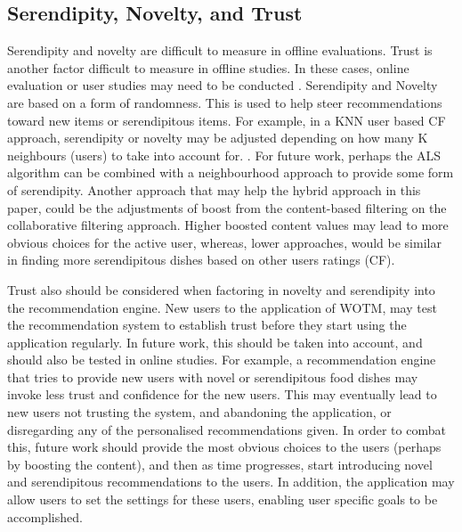 \subsection{Serendipity, Novelty, and Trust}
Serendipity and novelty are difficult to measure in offline evaluations. Trust is another factor difficult to measure in offline studies. In these cases, online evaluation or user studies may need to be conducted . Serendipity and Novelty are based on a form of randomness. This is used to help steer recommendations toward new items or serendipitous items. For example, in a KNN user based CF approach, serendipity or novelty may be adjusted depending on how many K neighbours (users) to take into account for. . For future work, perhaps the ALS algorithm can be combined with a neighbourhood approach to provide some form of serendipity. Another approach that may help the hybrid approach in this paper, could be the adjustments of boost from the content-based filtering on the collaborative filtering approach. Higher boosted content values may lead to more obvious choices for the active user, whereas, lower approaches, would be similar in finding more serendipitous dishes based on other users ratings (CF).  

Trust also should be considered when factoring in novelty and serendipity into the recommendation engine. New users to the application of WOTM, may test the recommendation system to establish trust before they start using the application regularly. In future work, this should be taken into account, and should also be tested in online studies. For example, a recommendation engine that tries to provide new users with novel or serendipitous food dishes may invoke less trust and confidence for the new users. This may eventually lead to new users not trusting the system, and abandoning the application, or disregarding any of the personalised recommendations given. In order to combat this, future work should provide the most obvious choices to the users (perhaps by boosting the content), and then as time progresses, start introducing novel and serendipitous recommendations to the users. In addition, the application may allow users to set the settings for these users, enabling user specific goals to be accomplished. 

